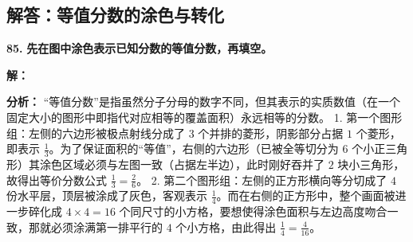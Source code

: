 \newpage

\subsection{解答：等值分数的涂色与转化}

\vspace{0.6cm}

\textbf{\LARGE 85.} \textbf{先在图中涂色表示已知分数的等值分数，再填空。}

\vspace{0.4cm}
\textbf{解：}

\textbf{分析：}
“等值分数”是指虽然分子分母的数字不同，但其表示的实质数值（在一个固定大小的图形中即指代对应相等的覆盖面积）永远相等的分数。
1. 第一个图形组：左侧的六边形被极点射线分成了 $3$ 个并排的菱形，阴影部分占据 $1$ 个菱形，即表示 $\displaystyle\frac{1}{3}$。为了保证面积的“等值”，右侧的六边形（已被全等切分为 $6$ 个小正三角形）其涂色区域必须与左图一致（占据左半边），此时刚好吞并了 $2$ 块小三角形，故得出等价分数公式 $\displaystyle\frac{1}{3} = \frac{2}{6}$。
2. 第二个图形组：左侧的正方形横向等分切成了 $4$ 份水平层，顶层被涂成了灰色，客观表示 $\displaystyle\frac{1}{4}$。而在右侧的正方形中，整个画面被进一步碎化成 $4 \times 4 = 16$ 个同尺寸的小方格，要想使得涂色面积与左边高度吻合一致，那就必须涂满第一排平行的 $4$ 个小方格，由此得出 $\displaystyle\frac{1}{4} = \frac{4}{16}$。

